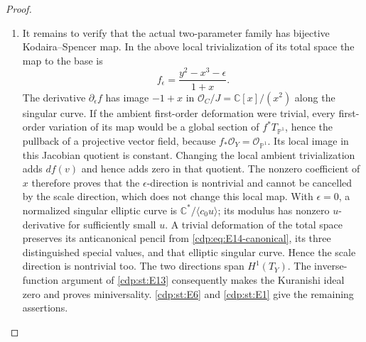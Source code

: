 \begin{proof}
\begin{enumerate}[label={$\langle1\rangle$\arabic*.},leftmargin=*]
\item It remains to verify that the actual two-parameter family has
bijective Kodaira--Spencer map. In the above local trivialization
of its total space the map to the base is
\[
 f_{\epsilon}=\frac{y^2-x^3-\epsilon}{1+x}.
\]
The derivative $\partial_\epsilon f$ has image $-1+x$ in
$\mathcal O_C/J=\mathbb C[x]/(x^2)$ along the singular curve.
If the ambient first-order deformation were trivial, every
first-order variation of its map would be a global section of
$f^*T_{\mathbb P^1}$, hence the pullback of a projective vector
field, because $f_*\mathcal O_Y=\mathcal O_{\mathbb P^1}$.
Its local image in this Jacobian quotient is constant. Changing
the local ambient trivialization adds $df(v)$ and hence adds
zero in that quotient. The nonzero coefficient of $x$ therefore
proves that the $\epsilon$-direction is nontrivial and cannot be
cancelled by the scale direction, which does not change this local
map. With $\epsilon=0$, a normalized singular elliptic curve is
$\mathbb C^*/\langle c_0u\rangle$; its modulus has nonzero
$u$-derivative for sufficiently small $u$. A trivial deformation
of the total space preserves its anticanonical pencil from
\eqref{cdp:eq:E14-canonical}, its three distinguished special values,
and that elliptic singular curve. Hence the scale direction is
nontrivial too. The two directions span $H^1(T_Y)$.
The inverse-function argument of \ref{cdp:st:E13} consequently makes the
Kuranishi ideal zero and proves miniversality. \ref{cdp:st:E6} and \ref{cdp:st:E1} give the
remaining assertions.

\end{enumerate}
\end{proof}
